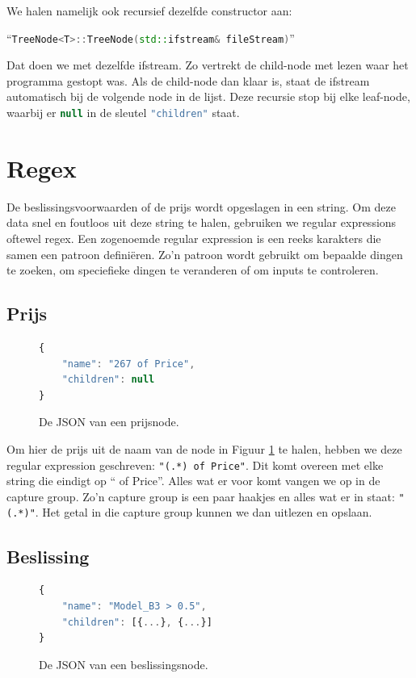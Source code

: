 We halen namelijk ook recursief dezelfde constructor aan:
\nopagebreak

``\lstinline[language=C++]{TreeNode<T>::TreeNode(std::ifstream& fileStream)}''
\nopagebreak

Dat doen we met dezelfde ifstream. Zo vertrekt de child-node met lezen waar het programma gestopt was. Als de child-node dan klaar is, staat de ifstream automatisch bij de volgende node in de lijst.
Deze recursie stop bij elke leaf-node, waarbij er \lstinline[language=JavaScript]{null} in de sleutel \lstinline[language=JavaScript]{"children"} staat.


\section{Regex} \label{sec:regex}
De beslissingsvoorwaarden of de prijs wordt opgeslagen in een string. Om deze data snel en foutloos uit deze string te halen, gebruiken we regular expressions oftewel regex. Een zogenoemde regular expression is een reeks karakters die samen een patroon definiëren. Zo'n patroon wordt gebruikt om bepaalde dingen te zoeken, om speciefieke dingen te veranderen of om inputs te controleren.\cite{wiki:regex}

\subsection{Prijs}
\begin{figure}[ht]
    \centering
    \begin{lstlisting}[language=JavaScript]
{
    "name": "267 of Price",
    "children": null
}
        \end{lstlisting}
    \caption{De JSON van een prijsnode.}
    \label{fig:json_leaf}
\end{figure}


Om hier de prijs uit de naam van de node in Figuur \ref{fig:json_leaf} te halen, hebben we deze regular expression geschreven: \lstinline{"(.*) of Price"}. Dit komt overeen met elke string die eindigt op `` of Price''. Alles wat er voor komt vangen we op in de capture group. Zo'n capture group is een paar haakjes en alles wat er in staat: \lstinline{"(.*)"}.\cite{Goyvaerts2017} Het getal in die capture group kunnen we dan uitlezen en opslaan.

\subsection{Beslissing}
\begin{figure}[ht]
    \centering
        \begin{lstlisting}[language=JavaScript]
{
    "name": "Model_B3 > 0.5",
    "children": [{...}, {...}]
}
        \end{lstlisting}
    \caption{De JSON van een beslissingsnode.}
    \label{fig:json_branch}
\end{figure}

